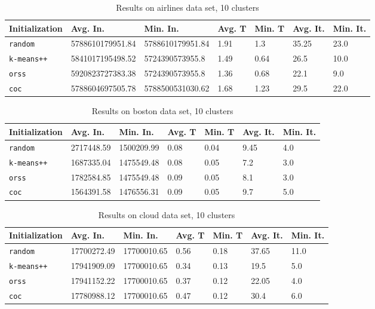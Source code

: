 \begin{table}[h]
	\begin{center}
		\begin{tabular}{|l|l|l|l|l|l|l|}
			\hline
			Initialization & Avg. In. & Min. In. & Avg. T & Min. T & Avg. It. & Min. It.\\\hline
			\texttt{random} & 5788610179951.84 & 5788610179951.84 & 1.91 & 1.3 & 35.25 & 23.0\\\hline
			\texttt{k-means++} & 5841017195498.52 & 5724390573955.8 & 1.49 & 0.64 & 26.5 & 10.0\\\hline
			\texttt{orss} & 5920823727383.38 & 5724390573955.8 & 1.36 & 0.68 & 22.1 & 9.0\\\hline
			\texttt{coc} & 5788604697505.78 & 5788500531030.62 & 1.68 & 1.23 & 29.5 & 22.0\\\hline
		\end{tabular}
		\caption{Results on airlines data set, 10 clusters}
		\label{tbl:airlines10}
	\end{center}
\end{table}

\begin{table}[h]
	\begin{center}
		\begin{tabular}{|l|l|l|l|l|l|l|}
			\hline
			Initialization & Avg. In. & Min. In. & Avg. T & Min. T & Avg. It. & Min. It.\\\hline
			\texttt{random} & 2717448.59 & 1500209.99 & 0.08 & 0.04 & 9.45 & 4.0\\\hline
			\texttt{k-means++} & 1687335.04 & 1475549.48 & 0.08 & 0.05 & 7.2 & 3.0\\\hline
			\texttt{orss} & 1782584.85 & 1475549.48 & 0.09 & 0.05 & 8.1 & 3.0\\\hline
			\texttt{coc} & 1564391.58 & 1476556.31 & 0.09 & 0.05 & 9.7 & 5.0\\\hline
		\end{tabular}
		\caption{Results on boston data set, 10 clusters}
		\label{tbl:boston10}
	\end{center}
\end{table}

\begin{table}[h]
	\begin{center}
		\begin{tabular}{|l|l|l|l|l|l|l|}
			\hline
			Initialization & Avg. In. & Min. In. & Avg. T & Min. T & Avg. It. & Min. It.\\\hline
			\texttt{random} & 17700272.49 & 17700010.65 & 0.56 & 0.18 & 37.65 & 11.0\\\hline
			\texttt{k-means++} & 17941909.09 & 17700010.65 & 0.34 & 0.13 & 19.5 & 5.0\\\hline
			\texttt{orss} & 17941152.22 & 17700010.65 & 0.37 & 0.12 & 22.05 & 4.0\\\hline
			\texttt{coc} & 17780988.12 & 17700010.65 & 0.47 & 0.12 & 30.4 & 6.0\\\hline
		\end{tabular}
		\caption{Results on cloud data set, 10 clusters}
		\label{tbl:cloud10}
	\end{center}
\end{table}

